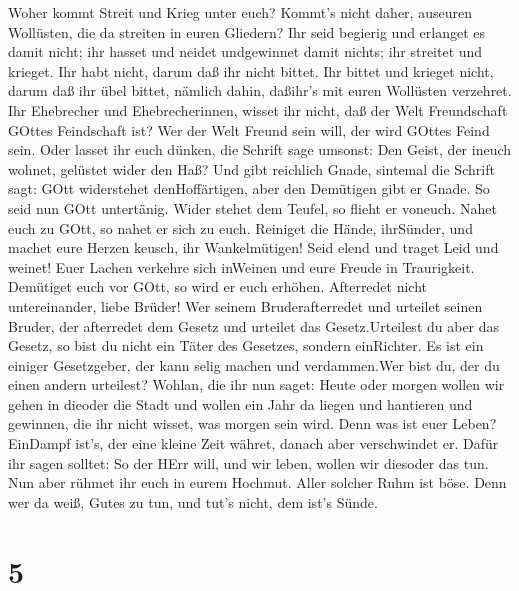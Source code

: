  Woher kommt Streit und Krieg unter euch? Kommt's nicht
daher, auseuren Wollüsten, die da streiten in euren Gliedern?
 Ihr seid begierig und erlanget es damit nicht; ihr hasset
und neidet undgewinnet damit nichts; ihr streitet und krieget. Ihr habt
nicht, darum daß ihr nicht bittet.  Ihr bittet und krieget
nicht, darum daß ihr übel bittet, nämlich dahin, daßihr's mit euren
Wollüsten verzehret.  Ihr Ehebrecher und Ehebrecherinnen,
wisset ihr nicht, daß der Welt Freundschaft GOttes Feindschaft ist? Wer
der Welt Freund sein will, der wird GOttes Feind sein.  Oder
lasset ihr euch dünken, die Schrift sage umsonst: Den Geist, der ineuch
wohnet, gelüstet wider den Haß?  Und gibt reichlich Gnade,
sintemal die Schrift sagt: GOtt widerstehet denHoffärtigen, aber den
Demütigen gibt er Gnade.  So seid nun GOtt untertänig. Wider
stehet dem Teufel, so flieht er voneuch.  Nahet euch zu
GOtt, so nahet er sich zu euch. Reiniget die Hände, ihrSünder, und
machet eure Herzen keusch, ihr Wankelmütigen!  Seid elend
und traget Leid und weinet! Euer Lachen verkehre sich inWeinen und eure
Freude in Traurigkeit.  Demütiget euch vor GOtt, so wird er
euch erhöhen.  Afterredet nicht untereinander, liebe
Brüder! Wer seinem Bruderafterredet und urteilet seinen Bruder, der
afterredet dem Gesetz und urteilet das Gesetz.Urteilest du aber das
Gesetz, so bist du nicht ein Täter des Gesetzes, sondern einRichter.
 Es ist ein einiger Gesetzgeber, der kann selig machen und
verdammen.Wer bist du, der du einen andern urteilest? 
Wohlan, die ihr nun saget: Heute oder morgen wollen wir gehen in dieoder
die Stadt und wollen ein Jahr da liegen und hantieren und gewinnen,
 die ihr nicht wisset, was morgen sein wird. Denn was ist
euer Leben? EinDampf ist's, der eine kleine Zeit währet, danach aber
verschwindet er.  Dafür ihr sagen solltet: So der HErr
will, und wir leben, wollen wir diesoder das tun.  Nun aber
rühmet ihr euch in eurem Hochmut. Aller solcher Ruhm ist böse.
 Denn wer da weiß, Gutes zu tun, und tut's nicht, dem ist's
Sünde.

\hypertarget{section-4}{%
\section{5}\label{section-4}}

